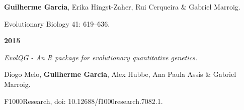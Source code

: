 \documentclass[12pt,twoside]{report}
\begin{document}
\textbf {Guilherme Garcia}, Erika Hingst-Zaher, Rui Cerqueira \& Gabriel Marroig.

Evolutionary Biology 41: 619–636.

\vspace {0.3 cm}

\textbf{2015}

\textit {EvolQG - An R package for evolutionary quantitative genetics.}

Diogo Melo, \textbf{Guilherme Garcia}, Alex Hubbe, Ana Paula Assis \& Gabriel Marroig.  

F1000Research, doi: 10.12688/f1000research.7082.1.








\end{document}

